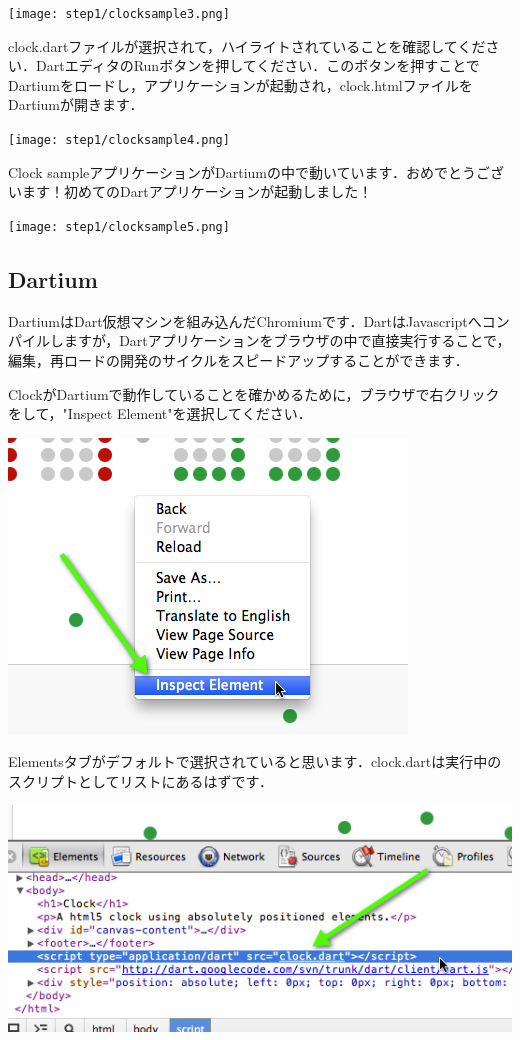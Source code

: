 \texttt{[image: step1/clocksample3.png]}

clock.dartファイルが選択されて，ハイライトされていることを確認してください．DartエディタのRunボタンを押してください．このボタンを押すことでDartiumをロードし，アプリケーションが起動され，clock.htmlファイルをDartiumが開きます．

\texttt{[image: step1/clocksample4.png]}

Clock sampleアプリケーションがDartiumの中で動いています．おめでとうございます！初めてのDartアプリケーションが起動しました！

\texttt{[image: step1/clocksample5.png]}

\subsection{Dartium}

DartiumはDart仮想マシンを組み込んだChromiumです．DartはJavascriptへコンパイルしますが，Dartアプリケーションをブラウザの中で直接実行することで，編集，再ロードの開発のサイクルをスピードアップすることができます．

ClockがDartiumで動作していることを確かめるために，ブラウザで右クリックをして，"Inspect Element"を選択してください．

\includegraphics{step1/dartium_img1.png}

Elementsタブがデフォルトで選択されていると思います．clock.dartは実行中のスクリプトとしてリストにあるはずです．

\includegraphics{step1/dartium_img2.png}

